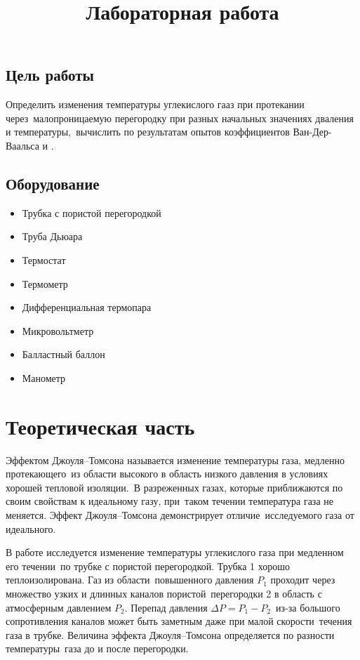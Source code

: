 \documentclass[a4paper, 12pt]{article}
\title{
  Лабораторная работа \textnumero \\
  \textbf{\textquote{\unskip}}
}
\author{}
\date{}
\begin{document}
\maketitle\thispagestyle{fancy}

\subsection*{Цель работы}
Определить изменения температуры углекислого гааз при протекании через\
малопроницаемую перегородку при разных начальных значениях дваления и температуры,\
вычислить по результатам опытов коэффициентов Ван-Дер-Ваальса  и . 

\subsection*{Оборудование}
\begin{itemize}[noitemsep]
  \item Трубка с пористой перегородкой
  \item Труба Дьюара
  \item Термостат
  \item Термометр
  \item Дифференциальная термопара
  \item Микровольтметр
  \item Балластный баллон
  \item Манометр
\end{itemize}

\section{Теоретическая часть}
Эффектом Джоуля–Томсона называется изменение температуры газа, медленно протекающего\
из области высокого в область низкого давления в условиях хорошей тепловой изоляции.\
В разреженных газах, которые приближаются по своим свойствам к идеальному газу, при\
таком течении температура газа не меняется. Эффект Джоуля–Томсона демонстрирует отличие\
исследуемого газа от идеального.

В работе исследуется изменение температуры углекислого газа при медленном его течении\
по трубке с пористой перегородкой. Трубка 1 хорошо теплоизолирована. Газ из области\
повышенного давления $ P_1 $ проходит через множество узких и длинных каналов пористой\
перегородки 2 в область с атмосферным давлением $ P_2 $. Перепад давления $ \Delta P = P_1 - P_2 $\
из-за большого сопротивления каналов может быть заметным даже при малой скорости\
течения газа в трубке. Величина эффекта Джоуля–Томсона определяется по разности температуры\
газа до и после перегородки.
\end{document}
